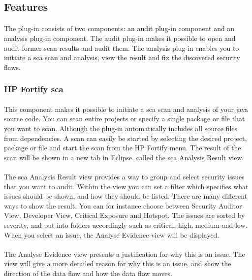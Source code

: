 \documentclass[11pt,english,a4paper]{report}
\begin{document}
\subsection{Features}
\paragraph{}
The plug-in consists of two components: an audit plug-in component and an analysis plug-in component. 
The audit plug-in makes it possible to open and audit former scan results and audit them. 
The analysis plug-in enables you to initiate a \gls{sca} scan and analysis, view the result and fix the discovered security flaws.

\subsubsection{HP Fortify \gls{sca}}
\paragraph{}
This component makes it possible to initiate a \gls{sca} scan and analysis of your \gls{java} source code.
You can scan entire projects or specify a single package or file that you want to scan. 
Although the plug-in automatically includes all source files from dependencies. 
A scan can easily be started by selecting the desired project, package or file and start the scan from the HP Fortify menu.
The result of the scan will be shown in a new tab in Eclipse, called the \gls{sca} Analysis Result view.

\paragraph{}
The \gls{sca} Analysis Result view provides a way to group and select security issues that you want to audit. 
Within the view you can set a filter which specifies what issues should be shown, and how they should be listed.
There are many different ways to show the result.
You can for instance choose between Security Auditor View, Developer View, Critical Exposure and Hotspot.
The issues are sorted by severity, and put into folders accordingly such as critical, high, medium and low. 
When you select an issue, the Analyse Evidence view will be displayed.

\paragraph{}
\label{analyseevidence}
The Analyse Evidence view presents a justification for why this is an issue.
The view will give a more detailed reason for why this is an issue, and show the direction of the data flow and how the data flow moves.
\end{document}

